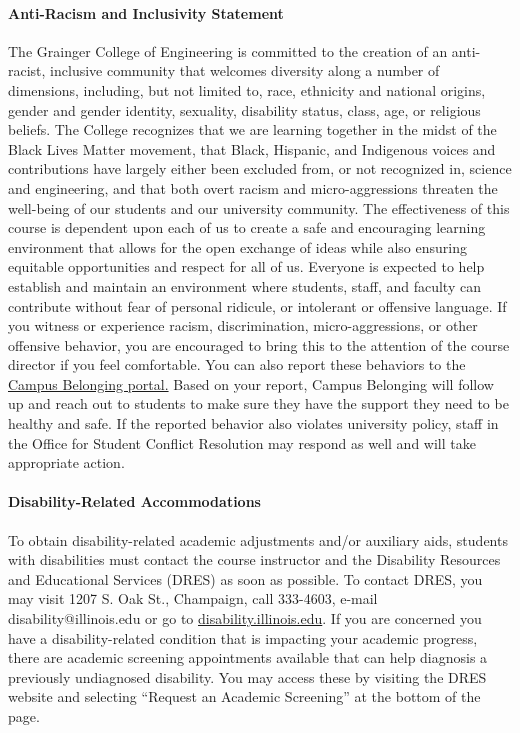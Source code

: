 \documentclass[11pt, a4paper]{article}
\begin{document}
\paragraph{Anti-Racism and Inclusivity Statement} The Grainger College of
        Engineering is committed to the creation of an anti-racist, inclusive
        community that welcomes diversity along a number of dimensions,
        including, but not limited to, race, ethnicity and national origins,
        gender and gender identity, sexuality, disability status, class, age,
        or religious beliefs. The College recognizes that we are learning
        together in the midst of the Black Lives Matter movement, that Black,
        Hispanic, and Indigenous voices and contributions have largely either
        been excluded from, or not recognized in, science and engineering, and
        that both overt racism and micro-aggressions threaten the well-being of
        our students and our university community.
        The effectiveness of this course is dependent upon each of us to create
        a safe and encouraging learning environment that allows for the open
        exchange of ideas while also ensuring equitable opportunities and
        respect for all of us. Everyone is expected to help establish and
        maintain an environment where students, staff, and faculty can
        contribute without fear of personal ridicule, or intolerant or
        offensive language. If you witness or experience racism,
        discrimination, micro-aggressions, or other offensive behavior, you are
        encouraged to bring this to the attention of the course director if you
        feel comfortable. You can also report these behaviors to the
        \href{https://diversity.illinois.edu/diversity-campus-culture/belonging-resources/}{Campus
        Belonging portal.}
         Based on your report, Campus Belonging will follow up and reach
        out to students to make sure they have the support they need to be
        healthy and safe. If the reported behavior also violates university
        policy, staff in the Office for Student Conflict Resolution may respond
        as well and will take appropriate action.

\paragraph{Disability-Related Accommodations}
To obtain disability-related academic adjustments and/or auxiliary aids,
students with disabilities must contact the course instructor and the
Disability Resources and Educational Services (DRES) as soon as possible. To
contact DRES, you may visit 1207 S. Oak St., Champaign, call 333-4603, e-mail
disability@illinois.edu or go to
\href{https://www.disability.illinois.edu}{disability.illinois.edu}.  If you
are concerned you have a disability-related condition that is impacting your
academic progress, there are academic screening appointments available that can
help diagnosis a previously undiagnosed disability. You may access these by
visiting the DRES website and selecting ``Request an Academic Screening'' at the
bottom of the page.
\end{document}
